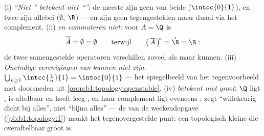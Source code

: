\begin{remark}
(i) \emph{``Niet '' betekent niet ``''}: de meeste
 zijn geen van beide ($\intoc{0}{1}$), en twee
 zijn allebei ($\emptyset$, $\R$) ---  en  zijn
geen tegengestelden maar duaal via het complement. (ii) \emph{
en  commuteren niet}: voor $A = \Q$ is
\[
\overline{\mathring A} = \overline\emptyset = \emptyset
\qquad\text{terwijl}\qquad
\bigl(\,\overline A\,\bigr)^{\!\circ} = \mathring \R = \R :
\]
de twee samengestelde operatoren verschillen zoveel als 
maar kunnen. (iii) \emph{Oneindige verenigingen van  kunnen niet  zijn}: $\bigcup_{n\geq1}
\intcc{\frac1n}{1} = \intoc{0}{1}$ --- het spiegelbeeld van het
tegenvoorbeeld met doorsneden uit
\cref{prop:b1:topology:openstable}. (iv) \emph{ betekent niet
groot}: $\Q$ ligt , is aftelbaar en heeft leeg , en haar
complement ligt eveneens ;  zegt ``willekeurig dicht bij
alles'', niet ``bijna alles'' --- de  van de
weekendopgave (\cref{pb:b1:topology:1}) maakt het tegenovergestelde punt:
een topologisch kleine  die overaftelbaar groot is.
\end{remark}

